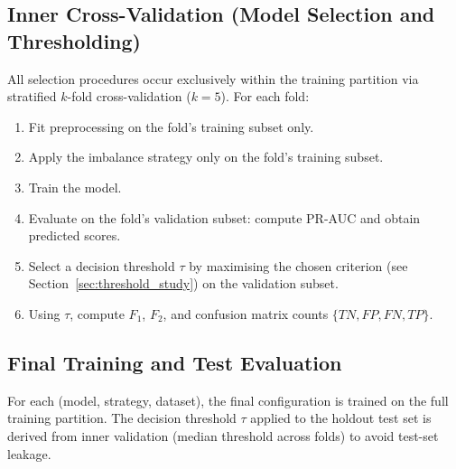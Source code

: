 \subsection{Inner Cross-Validation (Model Selection and Thresholding)}
All selection procedures occur exclusively within the training partition via stratified $k$-fold cross-validation ($k=5$). For each fold:
\begin{enumerate}
  \item Fit preprocessing on the fold's training subset only.
  \item Apply the imbalance strategy only on the fold's training subset.
  \item Train the model.
  \item Evaluate on the fold's validation subset: compute PR-AUC and obtain predicted scores.
  \item Select a decision threshold $\tau$ by maximising the chosen criterion (see Section~\ref{sec:threshold_study}) on the validation subset.
  \item Using $\tau$, compute $F_1$, $F_2$, and confusion matrix counts $\{TN, FP, FN, TP\}$.
\end{enumerate}

\subsection{Final Training and Test Evaluation}
For each (model, strategy, dataset), the final configuration is trained on the full training partition. The decision threshold $\tau$ applied to the holdout test set is derived from inner validation (median threshold across folds) to avoid test-set leakage.



